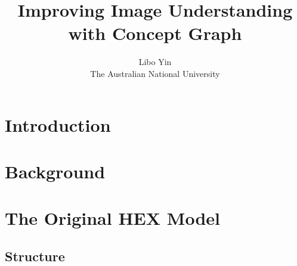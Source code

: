 \documentclass[11pt,a4paper]{article}
\begin{document}
\title{Improving Image Understanding with Concept Graph}
\author{Libo Yin\\The Australian National University}
\maketitle
\section{Introduction}

\section{Background}

\section{The Original HEX Model}
\subsection{Structure}
\end{document}
